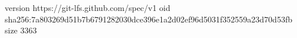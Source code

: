 version https://git-lfs.github.com/spec/v1
oid sha256:7a803269d51b7b6791282030dce396e1a2d02ef96d5031f352559a23d70d53fb
size 3363
